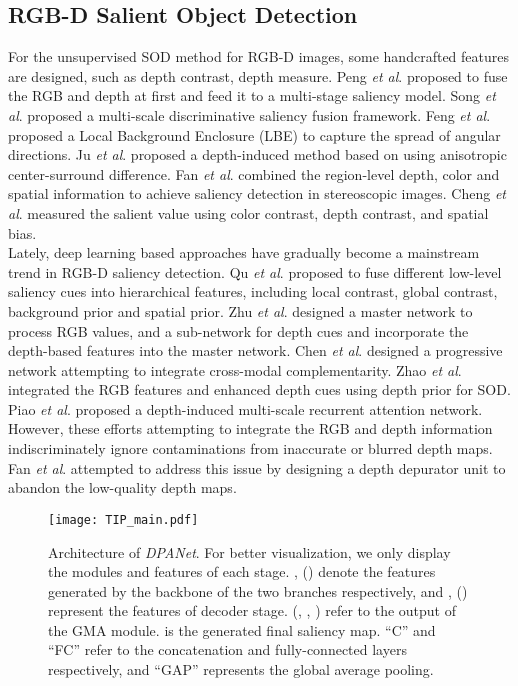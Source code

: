 \documentclass[journal]{IEEEtran}
\def\OURNET{\textit{DPANet}}
\newcommand{\etal}{\textit{et al}.}
\begin{document}
\subsection{RGB-D Salient Object Detection}
For the unsupervised SOD method for RGB-D images, some handcrafted features are designed, such as depth contrast, depth measure. Peng \etal \cite{peng2014rgbd} proposed to fuse the RGB and depth at first and feed it to a multi-stage saliency model. Song \etal \cite{song2017depth}  proposed a multi-scale discriminative saliency fusion framework. Feng \etal \cite{feng2016local} proposed a Local Background Enclosure (LBE) to capture the spread of angular directions.
Ju \etal \cite{ju2014depth} proposed a depth-induced method based on using anisotropic center-surround difference. Fan \etal \cite{fan2014salient} combined the region-level depth, color and spatial information to achieve saliency detection in stereoscopic images. Cheng \etal \cite{cheng2014depth} measured the salient value using color contrast, depth contrast, and spatial bias. \\
\indent Lately, deep learning based approaches have gradually become a mainstream trend in RGB-D saliency detection. Qu \etal \cite{qu2017rgbd} proposed to fuse different low-level saliency cues into hierarchical features, including local contrast, global contrast, background prior and spatial prior. Zhu \etal \cite{zhu2019pdnet} designed a master network to process RGB values, and a sub-network for depth cues and incorporate the depth-based features into the master network. Chen \etal \cite{chen2018progressively} designed a progressive network attempting to integrate cross-modal complementarity. Zhao \etal \cite{zhao2019contrast} integrated the RGB features and enhanced depth cues using depth prior for SOD. Piao \etal \cite{Piao_2019_ICCV} proposed a depth-induced multi-scale recurrent attention network. However, these efforts attempting to integrate the RGB and depth information indiscriminately ignore contaminations from inaccurate or blurred depth maps. Fan \etal \cite{fan2019D3Net} attempted to address this issue by designing a depth depurator unit to abandon the low-quality depth maps.
\begin{figure*}[t]
	 \centering
	\texttt{[image: TIP\_main.pdf]}	
\caption{Architecture of \OURNET. For better visualization, we only display the modules and features of each stage. ,  ()	denote the features generated by the backbone of the two branches respectively, and ,  () represent the features of decoder stage.  (, , ) refer to the output of the GMA module.  is the generated final saliency map. ``C'' and ``FC'' refer to the concatenation and fully-connected layers respectively, and ``GAP'' represents the global average pooling.}
	 \label{fig:main_plot}	
\end{figure*}
\end{document}
